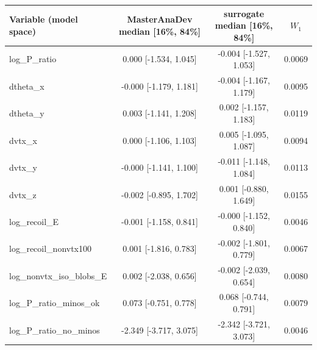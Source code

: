\begin{tabular}{lccc}
\toprule
Variable (model space) & MasterAnaDev median [16\%, 84\%] & surrogate median [16\%, 84\%] & $W_1$ \\
\midrule
log\_P\_ratio & 0.000 [-1.534, 1.045] & -0.004 [-1.527, 1.053] & 0.0069 \\
dtheta\_x & -0.000 [-1.179, 1.181] & -0.004 [-1.167, 1.179] & 0.0095 \\
dtheta\_y & 0.003 [-1.141, 1.208] & 0.002 [-1.157, 1.183] & 0.0119 \\
dvtx\_x & 0.000 [-1.106, 1.103] & 0.005 [-1.095, 1.087] & 0.0094 \\
dvtx\_y & -0.000 [-1.141, 1.100] & -0.011 [-1.148, 1.084] & 0.0113 \\
dvtx\_z & -0.002 [-0.895, 1.702] & 0.001 [-0.880, 1.649] & 0.0155 \\
log\_recoil\_E & -0.001 [-1.158, 0.841] & -0.000 [-1.152, 0.840] & 0.0046 \\
log\_recoil\_nonvtx100 & 0.001 [-1.816, 0.783] & -0.002 [-1.801, 0.779] & 0.0067 \\
log\_nonvtx\_iso\_blobs\_E & 0.002 [-2.038, 0.656] & -0.002 [-2.039, 0.654] & 0.0080 \\
log\_P\_ratio\_minos\_ok & 0.073 [-0.751, 0.778] & 0.068 [-0.744, 0.791] & 0.0079 \\
log\_P\_ratio\_no\_minos & -2.349 [-3.717, 3.075] & -2.342 [-3.721, 3.073] & 0.0046 \\
\bottomrule
\end{tabular}

